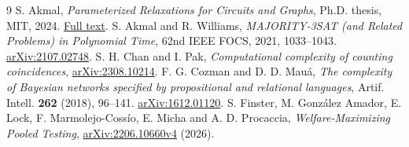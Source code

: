 \documentclass[11pt,a4paper]{amsart}
\begin{document}
\begin{thebibliography}{9}
S. Akmal, \emph{Parameterized Relaxations for Circuits and Graphs}, Ph.D. thesis, MIT, 2024. \href{https://www.shyanakmal.com/publications/ShyanAkmal_PhD-Thesis.pdf}{Full text}.
S. Akmal and R. Williams, \emph{MAJORITY-3SAT (and Related Problems) in Polynomial Time}, 62nd IEEE FOCS, 2021, 1033--1043. \href{https://arxiv.org/abs/2107.02748}{arXiv:2107.02748}.
S. H. Chan and I. Pak, \emph{Computational complexity of counting coincidences}, \href{https://arxiv.org/abs/2308.10214}{arXiv:2308.10214}.
F. G. Cozman and D. D. Mau\'a, \emph{The complexity of Bayesian networks specified by propositional and relational languages}, Artif. Intell. \textbf{262} (2018), 96--141. \href{https://arxiv.org/abs/1612.01120}{arXiv:1612.01120}.
S. Finster, M. Gonz\'alez Amador, E. Lock, F. Marmolejo-Coss\'io, E. Micha and A. D. Procaccia, \emph{Welfare-Maximizing Pooled Testing}, \href{https://arxiv.org/abs/2206.10660v4}{arXiv:2206.10660v4} (2026).
\end{thebibliography}
\end{document}
